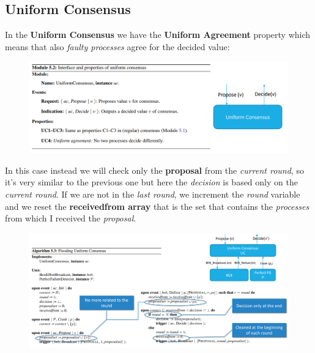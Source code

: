 \documentclass{article}
\begin{document}
\subsection{Uniform Consensus}
In the \textbf{Uniform Consensus} we have the \textbf{Uniform Agreement} property which means that also \emph{faulty processes} agree for the decided value:
\begin{figure}[H]
  \centering
  \includegraphics[scale=0.7,left]{cattura44.png}
\end{figure}
In this case instead we will check only the \textbf{proposal} from the \emph{current round}, so it's very similar to the previous one but here the \emph{decision} is based only on the \emph{current round}. If we are not in the \emph{last round}, we increment the \emph{round} variable and we reset the \textbf{receivedfrom array} that is the set that contains the \emph{processes} from which I received the \emph{proposal}. 
\begin{figure}[H]
  \centering
  \includegraphics[scale=0.7,left]{cattura45.png}
\end{figure}
\end{document}
